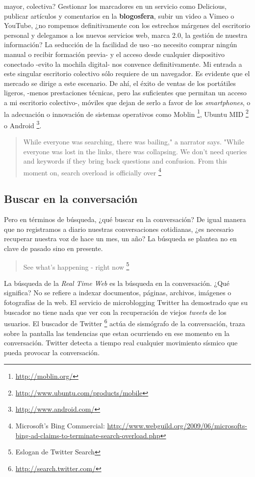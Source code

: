 \documentclass[12pt, a4paper,twoside]{book}
\begin{document}
mayor, colectiva? Gestionar los marcadores en un servicio como
Delicious, publicar artículos y comentarios en la
\textbf{blogosfera}, subir un video a Vimeo o YouTube, ¿no rompemos
definitivamente con los estrechos márgenes del escritorio personal
y delegamos a los nuevos servicios web, marca 2.0, la gestión de
nuestra información? La seducción de la facilidad de uso -no
necesito comprar ningún manual o recibir formación previa- y el
acceso desde cualquier dispositivo conectado -evito la mochila
digital- nos convence definitivamente. Mi entrada a este singular
escritorio colectivo sólo requiere de un navegador. Es evidente que
el mercado se dirige a este escenario. De ahí, el éxito de ventas
de los portátiles ligeros, -menos prestaciones técnicas, pero las
suficientes que permitan un acceso a mi escritorio colectivo-,
móviles que dejan de serlo a favor de los \emph{smartphones}, o la
adecuación o innovación de sistemas operativos como Moblin%
\footnote{\href{http://moblin.org/}{http://moblin.org/}},
Ubuntu MID%
\footnote{\href{http://www.ubuntu.com/products/mobile}{http://www.ubuntu.com/products/mobile}}
o Android%
\footnote{\href{http://www.android.com/}{http://www.android.com/}}.

\begin{quote}
While everyone was searching, there was bailing," a narrator says.
"While everyone was lost in the links, there was collapsing. We
don't need queries and keywords if they bring back questions and
confusion. From this moment on, search overload is officially over%
\footnote{Microsoft's Bing Commercial:
\href{http://www.webguild.org/2009/06/microsofts-bing-ad-claims-to-terminate-search-overload.php}{http://www.webguild.org/2009/06/microsofts-bing-ad-claims-to-terminate-search-overload.php}}

\end{quote}
\subsection{Buscar en la conversación}

Pero en términos de búsqueda, ¿qué buscar en la conversación? De
igual manera que no registramos a diario nuestras conversaciones
cotidianas, ¿es necesario recuperar nuestra voz de hace un mes, un
año? La búsqueda se plantea no en clave de pasado sino en
presente.

\begin{quote}
See what's happening - right now%
\footnote{Eslogan de Twitter Search}

\end{quote}
La búsqueda de la \emph{Real Time Web} es la búsqueda en la
conversación. ¿Qué significa? No se refiere a indexar documentos,
páginas, archivos, imágenes o fotografías de la web. El servicio de
microblogging Twitter ha demostrado que su buscador no tiene nada
que ver con la recuperación de viejos \emph{tweets} de los
usuarios. El buscador de Twitter%
\footnote{\href{http://search.twitter.com/}{http://search.twitter.com/}}
actúa de sismógrafo de la conversación, traza sobre la pantalla las
tendencias que estan ocurriendo en ese momento en la conversación.
Twitter detecta a tiempo real cualquier movimiento sísmico que
pueda provocar la conversación.
\end{document}
